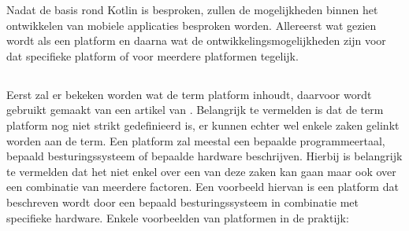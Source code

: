 Nadat de basis rond Kotlin is besproken, zullen de mogelijkheden binnen het ontwikkelen van mobiele applicaties besproken worden. Allereerst wat gezien wordt als een platform en daarna wat de ontwikkelingsmogelijkheden zijn voor dat specifieke platform of voor meerdere platformen tegelijk.

\subsection{}
\label{sec:SVZplatform}

Eerst zal er bekeken worden wat de term platform inhoudt, daarvoor wordt gebruikt gemaakt van een artikel van \textcite{Bishop2006}. Belangrijk te vermelden is dat de term platform nog niet strikt gedefinieerd is, er kunnen echter wel enkele zaken gelinkt worden aan de term. Een platform zal meestal een bepaalde programmeertaal, bepaald besturingssysteem of bepaalde hardware beschrijven. Hierbij is belangrijk te vermelden dat het niet enkel over een van deze zaken kan gaan maar ook over een combinatie van meerdere factoren. Een voorbeeld hiervan is een platform dat beschreven wordt door een bepaald besturingssysteem in combinatie met specifieke hardware. Enkele voorbeelden van platformen in de praktijk:
